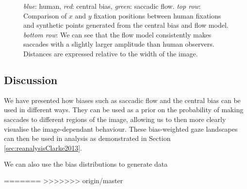 \begin{figure}[htb]
\centering
{}
\caption{\textit{blue}: human, \textit{red}: central bias, \textit{green}: saccadic flow. \textit{top row}: Comparison of $x$ and $y$ fixation positions between human fixations and synthetic points generated from the central bias and flow model. \textit{bottom row}: We can see that the flow model consistently makes saccades with a slightly larger amplitude than human observers. Distances are expressed relative to the width of the image.}
\label{fig:flowHumanComp}
\end{figure}

\subsection{Discussion}

We have presented how biases such as saccadic flow and the central bias can be used in different ways. They can be used as a prior on the probability of making saccades to different regions of the image, allowing us to then more clearly visualise the image-dependant behaviour. These bias-weighted gaze landscapes can then be used in analysis as demonstrated in Section \ref{sec:reanalysisClarke2013}.

We can also use the bias distributions to generate data

=======
>>>>>>> origin/master
